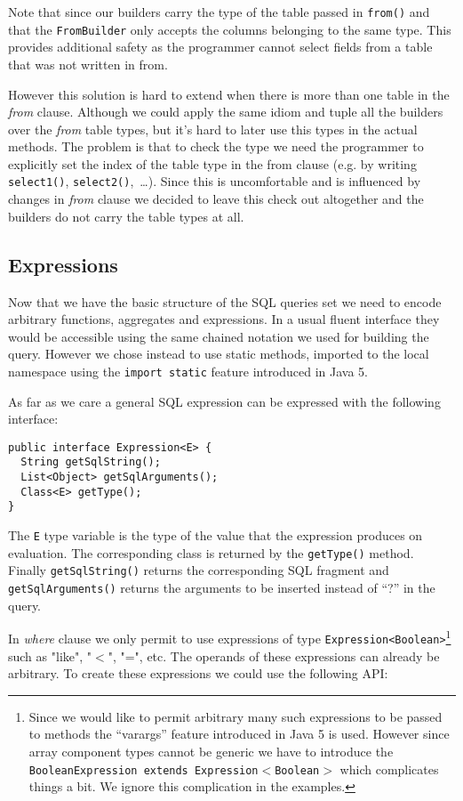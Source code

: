 \documentclass{sig-alternate}
\begin{document}
Note that since our builders carry the type of the table passed in \verb!from()! and that the \verb!FromBuilder! only accepts the columns belonging to the same type. This provides additional safety as the programmer cannot select fields from a table that was not written in from.

However this solution is hard to extend when there is more than one table in the \emph{from} clause. Although we could apply the same idiom and tuple all the builders over the \emph{from} table types, but it's hard to later use this types in the actual methods. The problem is that to check the type we need the programmer to explicitly set the index of the table type in the from clause (e.g. by writing \verb!select1()!, \verb!select2()!,~\ldots). Since this is uncomfortable and is influenced by changes in \emph{from} clause we decided to leave this check out altogether and the builders do not carry the table types at all.

\subsection{Expressions}

Now that we have the basic structure of the SQL queries set we need to encode arbitrary functions, aggregates and expressions. In a usual fluent interface they would be accessible using the same chained notation we used for building the query. However we chose instead to use static methods, imported to the local namespace using the \verb!import static! feature introduced in Java 5.

As far as we care a general SQL expression can be expressed with the following interface:

\begin{verbatim}
public interface Expression<E> {
  String getSqlString();
  List<Object> getSqlArguments();
  Class<E> getType();		
}
\end{verbatim}

The \verb!E! type variable is the type of the value that the expression produces on evaluation. The corresponding class is returned by the \verb!getType()! method. Finally \verb!getSqlString()! returns the corresponding SQL fragment and \verb!getSqlArguments()! returns the arguments to be inserted instead of ``?'' in the query. 

In \emph{where} clause we only permit to use expressions of type \verb!Expression<Boolean>!\footnote{Since we would like to permit arbitrary many such expressions to be passed to methods the ``varargs'' feature introduced in Java 5 is used. However since array component types cannot be generic we have to introduce the \texttt{BooleanExpression extends Expression$<$Boolean$>$} which complicates things a bit. We ignore this complication in the examples.} such as "like", "$<$", "=", etc. The operands of these expressions can already be arbitrary. To create these expressions we could use the following API:
\end{document}
